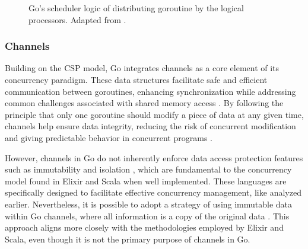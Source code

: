 \begin{figure}
    \centering
    \caption[Go’s scheduler logic of distributing goroutine by the logical processors]{Go’s scheduler logic of distributing goroutine by the logical processors. Adapted from \cite{Kennedy2016}.}
    \label{fig:gorutine-threads-relation}
\end{figure}

\subsubsection{Channels}

Building on the \gls{CSP} model, Go integrates channels as a core element of its concurrency paradigm. These data structures facilitate safe and efficient communication between goroutines, enhancing synchronization while addressing common challenges associated with shared memory access \cite{Kennedy2016}. By following the principle that only one goroutine should modify a piece of data at any given time, channels help ensure data integrity, reducing the risk of concurrent modification and giving predictable behavior in concurrent programs \cite{Cox-Buday2017}.

However, channels in Go do not inherently enforce data access protection features such as immutability and isolation \cite{Kennedy2016}, which are fundamental to the concurrency model found in Elixir and Scala when well implemented. These languages are specifically designed to facilitate effective concurrency management, like analyzed earlier. Nevertheless, it is possible to adopt a strategy of using immutable data within Go channels, where all information is a copy of the original data \cite{Cox-Buday2017}. This approach aligns more closely with the methodologies employed by Elixir and Scala, even though it is not the primary purpose of channels in Go.

